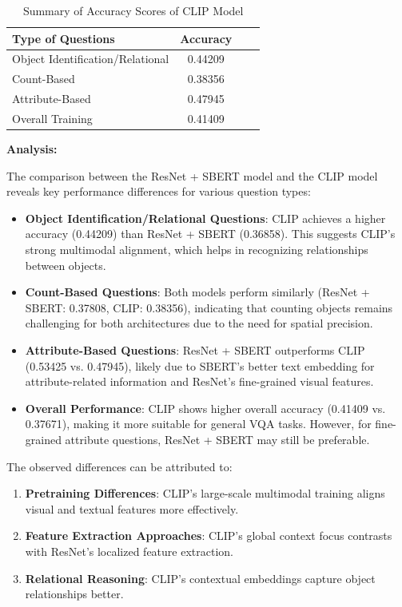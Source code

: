 \documentclass[11pt, oneside]{article}   	%
\begin{document}
\begin{table}[h!]
    \centering
    \begin{tabular}{|l|c|c|c|}
    \hline
    \textbf{Type of Questions} & \textbf{Accuracy} \\ \hline
    Object Identification/Relational & 0.44209 \\ \hline
    Count-Based & 0.38356 \\ \hline
    Attribute-Based & 0.47945 \\ \hline
    Overall Training & 0.41409 \\ \hline
    \end{tabular}
    \caption{Summary of Accuracy Scores of CLIP Model}
    \label{tab:question_type_summary}
\end{table}

\textbf{Analysis: }

The comparison between the ResNet + SBERT model and the CLIP model reveals key performance differences for various question types:

\begin{itemize}
    \item \textbf{Object Identification/Relational Questions}: 
    CLIP achieves a higher accuracy (0.44209) than ResNet + SBERT (0.36858). This suggests CLIP's strong multimodal alignment, which helps in recognizing relationships between objects.

    \item \textbf{Count-Based Questions}: 
    Both models perform similarly (ResNet + SBERT: 0.37808, CLIP: 0.38356), indicating that counting objects remains challenging for both architectures due to the need for spatial precision.

    \item \textbf{Attribute-Based Questions}: 
    ResNet + SBERT outperforms CLIP (0.53425 vs. 0.47945), likely due to SBERT's better text embedding for attribute-related information and ResNet's fine-grained visual features.

    \item \textbf{Overall Performance}: 
    CLIP shows higher overall accuracy (0.41409 vs. 0.37671), making it more suitable for general VQA tasks. However, for fine-grained attribute questions, ResNet + SBERT may still be preferable.
\end{itemize}

The observed differences can be attributed to:
\begin{enumerate}
    \item \textbf{Pretraining Differences}: CLIP's large-scale multimodal training aligns visual and textual features more effectively.
    \item \textbf{Feature Extraction Approaches}: CLIP's global context focus contrasts with ResNet's localized feature extraction.
    \item \textbf{Relational Reasoning}: CLIP's contextual embeddings capture object relationships better.
\end{enumerate}
\end{document}
